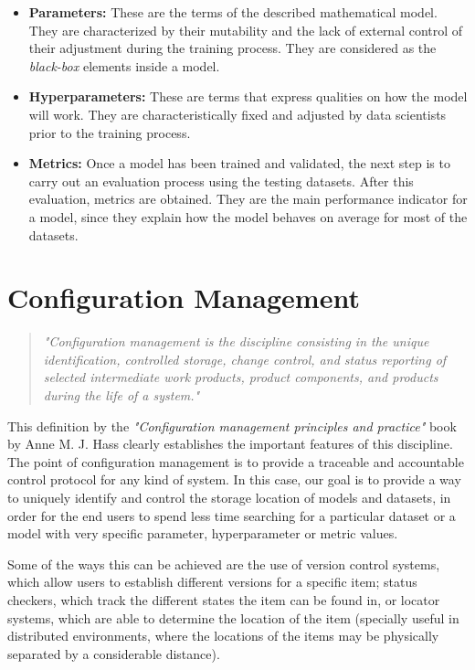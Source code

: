 \begin{itemize}
    \item \textbf{Parameters:} These are the terms of the described mathematical model. They are characterized by their mutability and the lack of external control of their adjustment
    during the training process. They are considered as the \emph{black-box} elements inside a model.

    \item \textbf{Hyperparameters:} These are terms that express qualities on how the model will work. They are characteristically fixed and adjusted by data scientists prior to the 
    training process.

    \item \textbf{Metrics:} Once a model has been trained and validated, the next step is to carry out an evaluation process using the testing datasets. After this evaluation,
    metrics are obtained. They are the main performance indicator for a model, since they explain how the model behaves on average for most of the datasets.

\end{itemize}

\section{Configuration Management}

\begin{quote}
    \emph{"Configuration management is the discipline consisting in the unique identification, controlled storage, change control, and status reporting
            of selected intermediate work products, product components, and products during the life of a system."}
\end{quote}

This definition by the \emph{"Configuration management principles and practice"} book by Anne M. J. Hass \cite{confmanagement} clearly establishes the important features of this discipline. The point
of configuration management is to provide a traceable and accountable control protocol for any kind of system. In this case, our goal is to provide a way to uniquely identify and
control the storage location of models and datasets, in order for the end users to spend less time searching for a particular dataset or a model with very specific parameter,
hyperparameter or metric values.

Some of the ways this can be achieved are the use of version control systems, which allow users to establish different versions for a specific item; status checkers, which track
the different states the item can be found in, or locator systems, which are able to determine the location of the item (specially useful in distributed environments, where the
locations of the items may be physically separated by a considerable distance).

